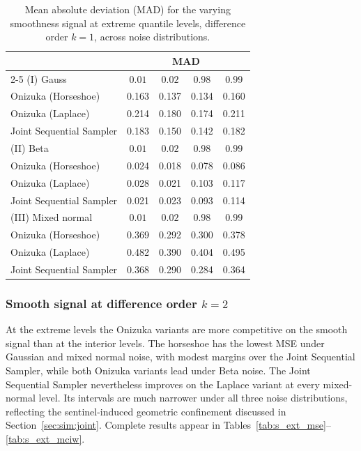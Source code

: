 \begin{table}[htbp]
\centering
\caption{Mean absolute deviation (MAD) for the varying smoothness signal at extreme quantile levels, difference order $k = 1$, across noise distributions.}
\label{tab:vs_ext_mad}
\begin{tabular}{lcccc}
\toprule
& \multicolumn{4}{c}{MAD} \\
\cmidrule(lr){2-5}
(I) Gauss & $0.01$ & $0.02$ & $0.98$ & $0.99$ \\
\midrule
Onizuka (Horseshoe)      & 0.163 & 0.137 & 0.134 & 0.160 \\
Onizuka (Laplace)        & 0.214 & 0.180 & 0.174 & 0.211 \\
Joint Sequential Sampler & 0.183 & 0.150 & 0.142 & 0.182 \\
\midrule
(II) Beta & $0.01$ & $0.02$ & $0.98$ & $0.99$ \\
\midrule
Onizuka (Horseshoe)      & 0.024 & 0.018 & 0.078 & 0.086 \\
Onizuka (Laplace)        & 0.028 & 0.021 & 0.103 & 0.117 \\
Joint Sequential Sampler & 0.021 & 0.023 & 0.093 & 0.114 \\
\midrule
(III) Mixed normal & $0.01$ & $0.02$ & $0.98$ & $0.99$ \\
\midrule
Onizuka (Horseshoe)      & 0.369 & 0.292 & 0.300 & 0.378 \\
Onizuka (Laplace)        & 0.482 & 0.390 & 0.404 & 0.495 \\
Joint Sequential Sampler & 0.368 & 0.290 & 0.284 & 0.364 \\
\bottomrule
\end{tabular}
\end{table}

\subsubsection{Smooth signal at difference order \texorpdfstring{$k=2$}{k=2}}
\label{app:sim:joint:smooth}

At the extreme levels the Onizuka variants are more competitive on the smooth
signal than at the interior levels.  The horseshoe has the lowest MSE under
Gaussian and mixed normal noise, with modest margins over the Joint Sequential
Sampler, while both Onizuka variants lead under Beta noise.  The Joint
Sequential Sampler nevertheless improves on the Laplace variant at every
mixed-normal level.  Its intervals are much narrower under all three noise
distributions, reflecting the sentinel-induced geometric confinement
discussed in Section~\ref{sec:sim:joint}.  Complete results appear in
Tables~\ref{tab:s_ext_mse}--\ref{tab:s_ext_mciw}.

